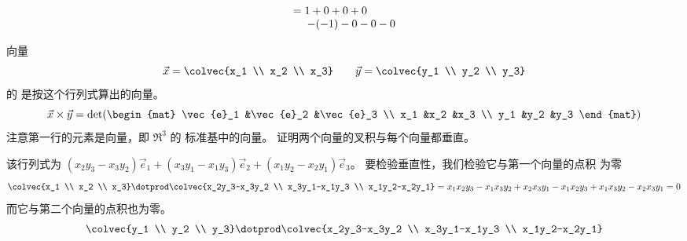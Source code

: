 \begin{exercises}
\begin{answer}
\begin{exparts}
\begin{equation*}
            =\begin{array}[t]{@{}l@{}}
               1+0+0+0 \\
               \>-(-1)-0-0-0
              \end{array}
           \end{equation*}
      \end{exparts}  
     \end{answer}
  \item 
    向量
    \begin{equation*}
      \vec{x}=\colvec{x_1 \\ x_2 \\ x_3}
      \qquad
      \vec{y}=\colvec{y_1 \\ y_2 \\ y_3}
    \end{equation*}
    的
    是按这个行列式算出的向量。
    \begin{equation*}
      \vec{x}\times\vec{y}=
      \det(\begin{mat}
        \vec{e}_1  &\vec{e}_2  &\vec{e}_3  \\
        x_1        &x_2        &x_3        \\
        y_1        &y_2        &y_3
      \end{mat})
    \end{equation*}
    注意第一行的元素是向量，即 $\Re^3$ 的
    标准基中的向量。
    证明两个向量的叉积与每个向量都垂直。
    \begin{answer}
      该行列式为 
      $
        (x_2y_3-x_3y_2)\vec{e}_1
          +(x_3y_1-x_1y_3)\vec{e}_2
          +(x_1y_2-x_2y_1)\vec{e}_3
      $。
      要检验垂直性，我们检验它与第一个向量的点积
      为零
      \begin{equation*}
        \colvec{x_1 \\ x_2 \\ x_3}
        \dotprod
        \colvec{x_2y_3-x_3y_2 \\ x_3y_1-x_1y_3 \\ x_1y_2-x_2y_1}
        =x_1x_2y_3-x_1x_3y_2+x_2x_3y_1-x_1x_2y_3+x_1x_3y_2-x_2x_3y_1=0
      \end{equation*}
      而它与第二个向量的点积也为零。
      \begin{equation*}
        \colvec{y_1 \\ y_2 \\ y_3}
        \dotprod
        \colvec{x_2y_3-x_3y_2 \\ x_3y_1-x_1y_3 \\ x_1y_2-x_2y_1}

\end{equation*}
\end{answer}
\end{exercises}
